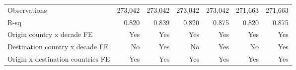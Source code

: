\begin{tabular}{l*{6}{r}}
Observations        &     273,042         &     273,042         &     273,042         &     273,042         &     271,663         &     271,663         \\
R-sq                &       0.820         &       0.839         &       0.820         &       0.875         &       0.820         &       0.875         \\
Origin country x decade FE&         Yes         &         Yes         &         Yes         &         Yes         &         Yes         &         Yes         \\
Destination country x decade FE&          No         &         Yes         &          No         &         Yes         &          No         &         Yes         \\
Origin x destination countries FE&         Yes         &         Yes         &         Yes         &         Yes         &         Yes         &         Yes         \\
\bottomrule \end{tabular}
